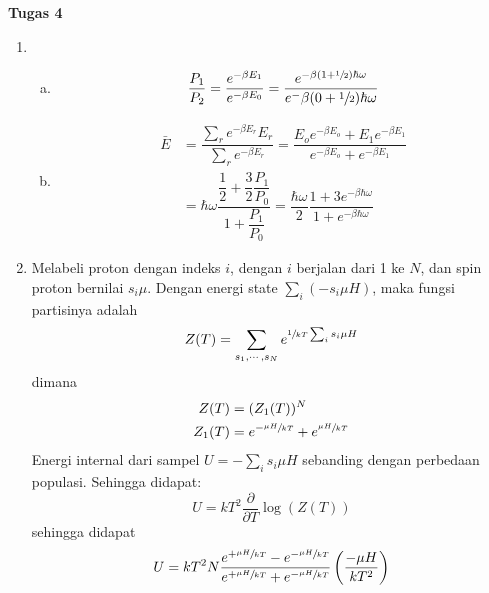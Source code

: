 \textbf{Tugas 4}
\begin{enumerate}
    \item \begin{enumerate}[(a)]
        \item 
        \begin{equation*}
            \dfrac{P_1}{P_2}=\dfrac{e^{-\beta E_1}}{e^{-\beta E_0}}=\dfrac{e^{-\beta(1+\sfrac{1}{2})\hbar\omega}}{e^-\beta(0+\sfrac{1}{2})\hbar\omega}
        \end{equation*}
        \item 
        \begin{equation*}
            \begin{split}
                \bar{E}&=\dfrac{\sum_re^{-\beta E_r}E_r}{\sum_r e^{-\beta E_r}}=\dfrac{E_oe^{-\beta E_o}+E_1e^{-\beta E_1}}{e^{-\beta E_o}+e^{-\beta E_1}}\\
                &=\hbar\omega\dfrac{\dfrac{1}{2}+\dfrac{3}{2}\dfrac{P_1}{P_0}}{1+\dfrac{P_1}{P_0}}=\dfrac{\hbar\omega}{2}\dfrac{1+3e^{-\beta\hbar\omega}}{1+e^{-\beta\hbar\omega}}
            \end{split}
        \end{equation*}
    \end{enumerate}
    \item Melabeli proton dengan indeks $i$, dengan $i$ berjalan dari 1 ke $N$, dan spin proton bernilai $s_i\mu$. Dengan energi state $\sum_i(-s_i\mu H)$, maka fungsi partisinya adalah
    \begin{equation*}
        Z(T)=\sum_{s_1,\cdots,s_N} e^{\sfrac{1}{kT}\sum_i s_i\mu H}
    \end{equation*}
    dimana
    \begin{equation*}
        \begin{split}
            Z(T)&=(Z_1(T))^N\\
            Z_1(T)&=e^{-\sfrac{\mu H}{kT}}+e^{\sfrac{\mu H}{kT}}
        \end{split}
    \end{equation*}
    Energi internal dari sampel $U=-\sum_i s_i\mu H$ sebanding dengan perbedaan populasi. Sehingga didapat:
    \begin{equation*}
        U=kT^2 \dfrac{\partial}{\partial T} \log(Z(T))
    \end{equation*}
    sehingga didapat
    \begin{equation*}
    	U=kT^2N\dfrac{e^{+\sfrac{\mu H}{kT}}-e^{-\sfrac{\mu H}{kT}}}{e^{+\sfrac{\mu H}{kT}}+e^{-\sfrac{\mu H}{kT}}}\left(\dfrac{-\mu H}{kT^2}\right)
    \end{equation*}

\end{enumerate}

